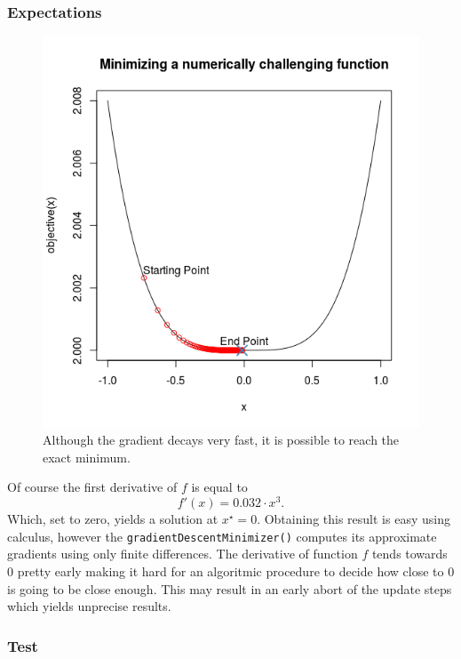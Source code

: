 \documentclass{article}
\begin{document}
\subsubsection{Expectations}

\begin{figure}
\centering
\includegraphics[scale=0.3]{../BRM/gradientDescent.png}
\caption{Although the gradient decays very fast, it is possible to reach the exact minimum.}
\end{figure}

Of course the first derivative of $f$ is equal to $$f\prime(x)=0.032\cdot x^3.$$ Which, set to zero, yields a solution at $x^\star=0$. Obtaining this result is easy using calculus, however the \texttt{gradientDescentMinimizer()} computes its approximate gradients using only finite differences. The derivative of function $f$ tends towards 0 pretty early making it hard for an algoritmic procedure to decide how close to 0 is going to be close enough. This may result in an early abort of the update steps which yields unprecise results.
\vspace{5mm}
\subsubsection{Test}
\end{document}
